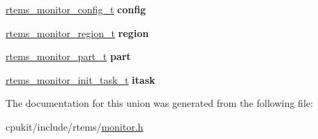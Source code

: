\begin{DoxyCompactItemize}
\mbox{\hyperlink{structrtems__monitor__config__t}{rtems\+\_\+monitor\+\_\+config\+\_\+t}} {\bfseries config}
\item 
\mbox{\label{unionrtems__monitor__union__t_a0e04be97f3f489ce449601f4cf2c9b40}} 
\mbox{\hyperlink{structrtems__monitor__region__t}{rtems\+\_\+monitor\+\_\+region\+\_\+t}} {\bfseries region}
\item 
\mbox{\label{unionrtems__monitor__union__t_afb54a173989983a7b3a442c7f9527fb7}} 
\mbox{\hyperlink{structrtems__monitor__part__t}{rtems\+\_\+monitor\+\_\+part\+\_\+t}} {\bfseries part}
\item 
\mbox{\label{unionrtems__monitor__union__t_af8a3a01121e8293370019b46e4f8d12b}} 
\mbox{\hyperlink{structrtems__monitor__init__task__t}{rtems\+\_\+monitor\+\_\+init\+\_\+task\+\_\+t}} {\bfseries itask}
\end{DoxyCompactItemize}


The documentation for this union was generated from the following file\+:\begin{DoxyCompactItemize}
\item 
cpukit/include/rtems/\mbox{\hyperlink{monitor_8h}{monitor.\+h}}\end{DoxyCompactItemize}
